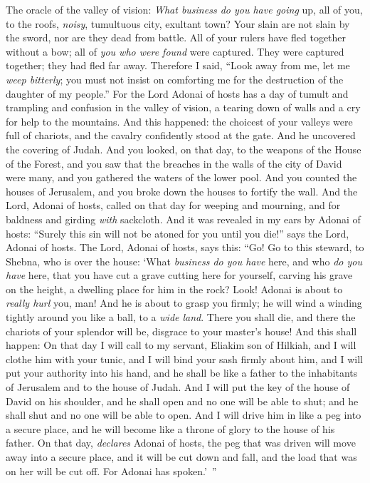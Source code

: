 \begin{biblechapter} %
 The oracle of the valley of vision: \textit{What business do you have going} up, all of you, to the roofs,
\verse \textit{noisy}, tumultuous city, 
exultant town? 
Your slain are not slain by the sword, 
nor are they dead from battle.
\verse All of your rulers have fled together without a bow; 
all of \textit{you who were found} were captured. 
They were captured together; 
they had fled far away.
\verse Therefore I said,
\verse “Look away from me, 
let me \textit{weep bitterly}; 
you must not insist on comforting me 
for the destruction of the daughter of my people.”
\verse For the Lord Adonai of hosts has a day of tumult and trampling and confusion in the valley of vision, 
a tearing down of walls and a cry for help to the mountains.
\verse And this happened:
\verse the choicest of your valleys were full of chariots, 
and the cavalry confidently stood at the gate.
\verse And he uncovered the covering of Judah. 
And you looked, on that day, to the weapons of the House of the Forest,
\verse and you saw that the breaches in the walls of the city of David were many, 
and you gathered the waters of the lower pool.
\verse And you counted the houses of Jerusalem, 
and you broke down the houses to fortify the wall.
\verse And the Lord, Adonai of hosts, called on that day
\verse for weeping and mourning, 
and for baldness and girding \textit{with} sackcloth.
\verse And it was revealed in my ears by Adonai of hosts: “Surely this sin will not be atoned for you until you die!” 
says the Lord, Adonai of hosts.
 The Lord, Adonai of hosts, says this:
\verse “Go! Go to this steward, to Shebna, 
who is over the house:
\verse ‘What \textit{business do you have} here, 
and who \textit{do you have} here, 
that you have cut a grave cutting here for yourself, 
carving his grave on the height, 
a dwelling place for him in the rock?
\verse Look! Adonai is about to \textit{really hurl} you, man! 
And he is about to grasp you firmly;
\verse he will wind a winding tightly around you like a ball, to a \textit{wide land}. 
There you shall die, 
and there the chariots of your splendor will be, 
disgrace to your master’s house!
\verse And this shall happen:
\verse On that day I will call to my servant, Eliakim son of Hilkiah,
\verse and I will clothe him with your tunic, 
and I will bind your sash firmly about him, 
and I will put your authority into his hand, 
and he shall be like a father to the inhabitants of Jerusalem 
and to the house of Judah.
\verse And I will put the key of the house of David on his shoulder, 
and he shall open and no one will be able to shut; 
and he shall shut and no one will be able to open.
\verse And I will drive him in like a peg into a secure place, 
and he will become like a throne of glory to the house of his father.
\verse On that day, \textit{declares} Adonai of hosts, the peg that was driven will move away into a secure place, and it will be cut down and fall, and the load that was on her will be cut off. For Adonai has spoken.’ ”
\end{biblechapter}

